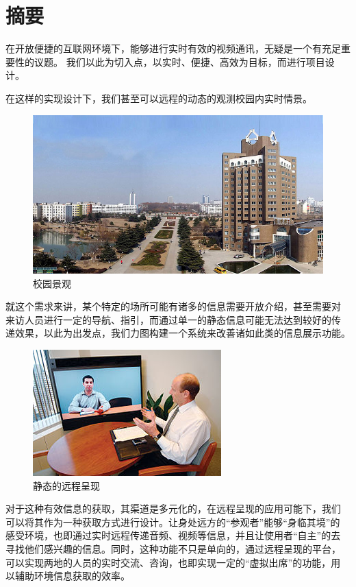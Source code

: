\chapter[前言]{摘要} 
\label{cha:front}

在开放便捷的互联网环境下，能够进行实时有效的视频通讯，无疑是一个有充足重要性的议题。
我们以此为切入点，以实时、便捷、高效为目标，而进行项目设计。
 
在这样的实现设计下，我们甚至可以远程的动态的观测校园内实时情景。
\begin{figure}[h]
        \centering
                \includegraphics[width=.70\textwidth]{Figures/ch1.school.jpg}
        \caption{校园景观}
        \label{fig:executive}
\end{figure}

就这个需求来讲，某个特定的场所可能有诸多的信息需要开放介绍，甚至需要对
来访人员进行一定的导航、指引，而通过单一的静态信息可能无法达到较好的传
递效果，以此为出发点，我们力图构建一个系统来改善诸如此类的信息展示功能。

\begin{figure}[h]
        \centering
                \includegraphics[width=.50\textwidth]{Figures/ch1.tele.jpg}
        \caption{静态的远程呈现}
        \label{fig:execimage2}
\end{figure}

对于这种有效信息的获取，其渠道是多元化的，在远程呈现的应用可能下，我们
可以将其作为一种获取方式进行设计。让身处远方的“参观者”能够“身临其境”的
感受环境，也即通过实时远程传递音频、视频等信息，并且让使用者“自主”的去
寻找他们感兴趣的信息。同时，这种功能不只是单向的，通过远程呈现的平台，
可以实现两地的人员的实时交流、咨询，也即实现一定的“虚拟出席”的功能，用
以辅助环境信息获取的效率。

